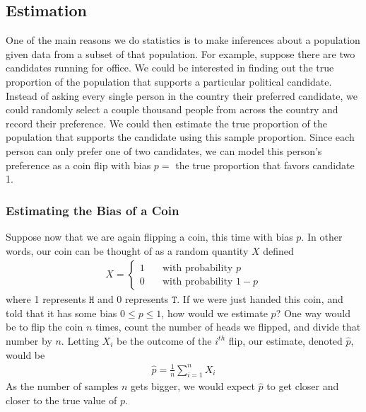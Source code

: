 \documentclass[11pt,letterpaper]{article}
\newcommand\hd{\texttt{H}}
\newcommand\tl{\texttt{T}}
\numberwithin{theorem}{section}
\numberwithin{definition}{section}
\numberwithin{lemma}{section}
\numberwithin{corollary}{section}
\numberwithin{proposition}{section}
\theoremstyle{definition}
\numberwithin{remark}{section}
\numberwithin{claim}{section}
\numberwithin{observation}{section}
\numberwithin{fact}{section}
\numberwithin{assumption}{section}
\numberwithin{example}{section}
\numberwithin{exercise}{section}
\begin{document}
\subsection{Estimation}
One of the main reasons we do statistics is to make inferences about a population given data from a subset of that population. For example, suppose there are two candidates running for office. We could be interested in finding out the true proportion of the population that supports a particular political candidate. Instead of asking every single person in the country their preferred candidate, we could randomly select a couple thousand people from across the country and record their preference. We could then estimate the true proportion of the population that supports the candidate using this sample proportion. Since each person can only prefer one of two candidates, we can model this person's preference as a coin flip with bias $p = $ the true proportion that favors candidate 1.

\subsubsection{Estimating the Bias of a Coin}

Suppose now that we are again flipping a coin, this time with bias $p$. In other words, our coin can be thought of as a random quantity $X$ defined
\begin{align*}
X = \begin{cases}
1 \hspace{1em} &\text{with probability }p \\
0 &\text{with probability }1-p
\end{cases}
\end{align*}
where 1 represents $\hd$ and 0 represents $\tl$. If we were just handed this coin, and told that it has some bias $0 \leq p \leq 1$, how would we estimate $p$? One way would be to flip the coin $n$ times, count the number of heads we flipped, and divide that number by $n$. Letting $X_i$ be the outcome of the $i^{th}$ flip, our estimate, denoted $\hat{p}$, would be
\begin{align*}
\hat{p}= \frac{1}{n} \sum_{i=1}^n X_i
\end{align*}
As the number of samples $n$ gets bigger, we would expect $\hat{p}$ to get closer and closer to the true value of $p$.
\end{document}
